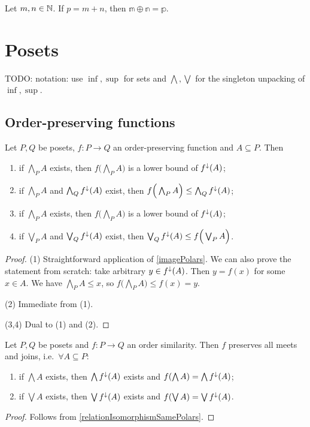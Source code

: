 \begin{lemma}
Let $m,n\in \mathbb{N}$. If $p = m+n$, then $\mathbb{m}\oplus\mathbb{n} = \mathbb{p}$.
\end{lemma}


\chapter{Posets}
TODO: notation: use $\inf, \sup$ for sets and $\bigwedge, \bigvee$ for the singleton unpacking of $\inf,\sup$.

\section{Order-preserving functions}

\begin{proposition} \label{mappingJoinsMeets}
Let $P,Q$ be posets, $f:P\to Q$ an order-preserving function and $A\subseteq P$. Then
\begin{enumerate}
\item if $\bigwedge_P A$ exists, then $f\Big(\bigwedge_P A\Big)$ is a lower bound of $f^\downarrow(A)$;
\item if $\bigwedge_P A$ and $\bigwedge_Q f^\downarrow(A)$ exist, then $f\Big(\bigwedge_P A\Big)\leq \bigwedge_Q f^\downarrow(A)$;
\item if $\bigwedge_P A$ exists, then $f\Big(\bigwedge_P A\Big)$ is a lower bound of $f^\downarrow(A)$;
\item if $\bigvee_P A$ and $\bigvee_Q f^\downarrow(A)$ exist, then $\bigvee_Q f^\downarrow(A) \leq f\Big(\bigvee_P A\Big)$.
\end{enumerate}
\end{proposition}
\begin{proof}
(1) Straightforward application of \ref{imagePolars}. We can also prove the statement from scratch: take arbitrary $y\in f^\downarrow(A)$. Then $y = f(x)$ for some $x\in A$. We have $\bigwedge_P A \leq x$, so $f\Big(\bigwedge_P A\Big) \leq f(x) = y$.

(2) Immediate from (1).

(3,4) Dual to (1) and (2).
\end{proof}

\begin{lemma} \label{orderSimilarityPreservesJoinsMeets}
Let $P,Q$ be posets and $f:P\to Q$ an order similarity. Then $f$ preserves all meets and joins, i.e.\ $\forall A\subseteq P$:
\begin{enumerate}
\item if $\bigwedge A$ exists, then $\bigwedge f^\downarrow(A)$ exists and $f(\bigwedge A) = \bigwedge f^\downarrow(A)$;
\item if $\bigvee A$ exists, then $\bigvee f^\downarrow(A)$ exists and $f(\bigvee A) = \bigvee f^\downarrow(A)$.
\end{enumerate}
\end{lemma}
\begin{proof}
Follows from \ref{relationIsomorphismSamePolars}.
\end{proof}

